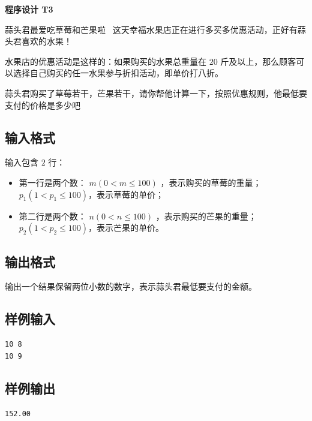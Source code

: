 \documentclass{article}
\newcommand{\problemname}[1]{\begin{center}\Large\bfseries #1\end{center}}
\begin{document}
\problemname{程序设计 T3}

蒜头君最爱吃草莓和芒果啦~ 这天幸福水果店正在进行多买多优惠活动，正好有蒜头君喜欢的水果！

水果店的优惠活动是这样的：如果购买的水果总重量在 $20$ 斤及以上，那么顾客可以选择自己购买的任一水果参与折扣活动，即单价打八折。

蒜头君购买了草莓若干，芒果若干，请你帮他计算一下，按照优惠规则，他最低要支付的价格是多少吧~

\subsection*{输入格式}
输入包含 $2$ 行：

\begin{itemize}
  \item 

第一行是两个数： $m(0<m\le100)$ ，表示购买的草莓的重量； $p_{1}(1<p_{1}\le100)$，表示草莓的单价；

  \item 

第二行是两个数： $n(0<n\le100)$ ，表示购买的芒果的重量； $p_{2}(1<p_{2}\le100)$，表示芒果的单价。

\end{itemize}
\subsection*{输出格式}
输出一个结果保留两位小数的数字，表示蒜头君最低要支付的金额。

\subsection*{样例输入}
\begin{verbatim}
10 8
10 9
\end{verbatim}

\subsection*{样例输出}
\begin{verbatim}
152.00
\end{verbatim}
\end{document}
